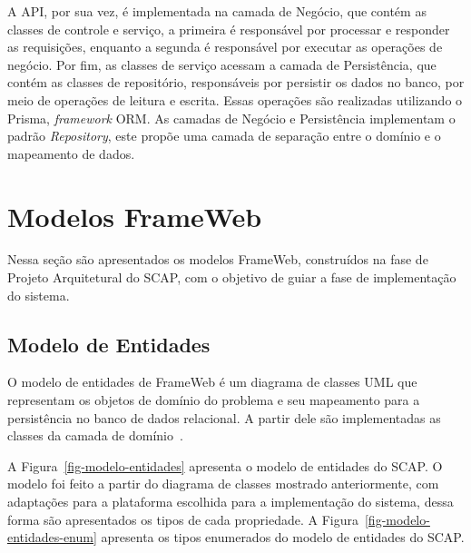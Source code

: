 A API, por sua vez, é implementada na camada de Negócio, que contém as classes de controle e serviço, a primeira é responsável por processar e responder as requisições,
enquanto a segunda é responsável por executar as operações de negócio.
Por fim, as classes de serviço acessam a camada de Persistência, que contém as classes de repositório, responsáveis por
persistir os dados no banco, por meio de operações de leitura e escrita. Essas operações são realizadas utilizando o Prisma,
\textit{framework} ORM. As camadas de Negócio e Persistência implementam o padrão \textit{Repository}, este propõe uma
camada de separação entre o domínio e o mapeamento de dados.




\section{Modelos FrameWeb}
\label{sec-projeto-frameweb}

Nessa seção são apresentados os modelos FrameWeb, construídos na fase de Projeto Arquitetural
do SCAP, com o objetivo de guiar a fase de implementação do sistema.

\subsection{Modelo de Entidades}
\label{subsec-frameweb-entidades}
O modelo de entidades de FrameWeb é um diagrama de classes UML que representam
os objetos de domínio do problema e seu mapeamento para a persistência no banco de dados
relacional. A partir dele são implementadas as classes da camada de domínio~\cite{souza:2007}.

A Figura~\ref{fig-modelo-entidades} apresenta o modelo de entidades do SCAP. O modelo foi feito
a partir do diagrama de classes mostrado anteriormente, com adaptações para a plataforma 
escolhida para a implementação do sistema, dessa forma são apresentados os tipos
de cada propriedade. A Figura~\ref{fig-modelo-entidades-enum} apresenta
os tipos enumerados do modelo de entidades do SCAP.

